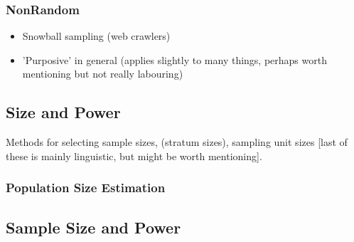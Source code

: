 \subsubsection{NonRandom}

\begin{itemize}
    \item Snowball sampling (web crawlers)
    \item 'Purposive' in general (applies slightly to many things, perhaps worth mentioning but not really labouring)
\end{itemize}












\subsection{Size and Power}
Methods for selecting sample sizes, (stratum sizes), sampling unit sizes [last of these is mainly linguistic, but might be worth mentioning].

\subsubsection{Population Size Estimation}


\subsection{Sample Size and Power}










